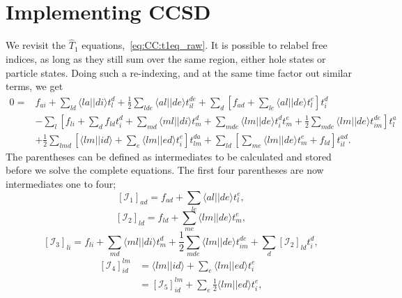 \section{Implementing CCSD}
We revisit the $\hat{T}_1$ equations,~\eqref{eq:CC:t1eq_raw}.
It is possible to relabel free indices, as long as they still sum over the same region, either hole states or particle states.
Doing such a re-indexing, and at the same time factor out similar terms, we get
\begin{equation}
\begin{split}
0 =&
f_{ai}  + \sum_{ld} \langle la||di \rangle t_l^d  + \frac{1}{2} \sum_{lde} \langle al||de \rangle t_{il}^{de} 
+ \sum_d \left[ 
 f_{ad} + \sum_{le} \langle al||de \rangle t_l^e
\right]  t_i^d   
\\
%
&- \sum_l \left[
f_{li} +  \sum_{d} f_{ld} t_i^d  + \sum_{md} \langle ml||di \rangle t_m^d 
+ \sum_{mde} \langle lm||de \rangle t_i^d t_m^e 
+ \frac{1}{2} \sum_{mde} \langle lm||de \rangle t_{im}^{de}
\right] t_l^a \\
%
& + \frac{1}{2} \sum_{lmd} \left[
\langle lm||id \rangle + \sum_{e} \langle lm||ed \rangle t_i^e 
\right] t_{lm}^{da}
+
\sum_{ld} \left[
\sum_{me} \langle lm||de \rangle t_m^e + f_{ld}
\right] t_{il}^{ad} .
\end{split}
\end{equation}
The parentheses can be defined as intermediates to be calculated and stored before we solve the complete equations.
The first four parentheses are now intermediates one to four;
\begin{equation}
\left[ \mathcal{I}_1 \right]_{ad} =  f_{ad} + \sum_{le} \langle al||de \rangle t_l^e ,
\end{equation}
\begin{equation}
\left[ \mathcal{I}_2 \right]_{ld} = f_{ld} +  \sum_{me} \langle lm||de \rangle t_m^e  ,
\end{equation}
\begin{equation}
\left[ \mathcal{I}_3 \right]_{li} = 
f_{li}   + \sum_{md} \langle ml||di \rangle t_m^d 
+ \frac{1}{2} \sum_{mde} \langle lm||de \rangle t_{im}^{de}
+ \sum_d \left[\mathcal{I}_2 \right]_{ld} t_i^d ,
\end{equation}
\begin{equation}
\begin{split}
\left[ \mathcal{I}_4 \right]_{id}^{lm} &= \langle lm||id \rangle + \sum_e \langle lm||ed \rangle t_i^e \\
&= \left[\mathcal{I}_5 \right]_{id}^{lm} + \sum_e \frac{1}{2}\langle lm||ed \rangle t_i^e ,
\end{split}
\end{equation}
